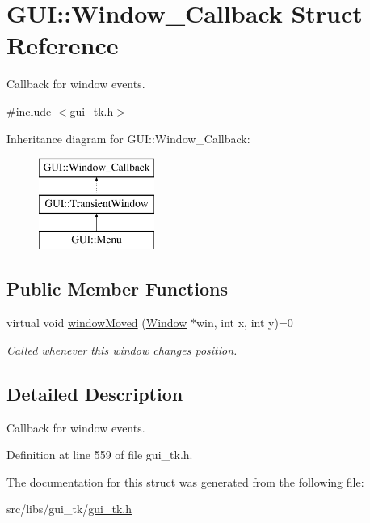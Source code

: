 \hypertarget{structGUI_1_1Window__Callback}{\section{G\-U\-I\-:\-:Window\-\_\-\-Callback Struct Reference}
\label{structGUI_1_1Window__Callback}
}


Callback for window events.  




{\ttfamily \#include $<$gui\-\_\-tk.\-h$>$}

Inheritance diagram for G\-U\-I\-:\-:Window\-\_\-\-Callback\-:\begin{figure}[H]
\begin{center}
\leavevmode
\includegraphics[height=3.000000cm]{structGUI_1_1Window__Callback}
\end{center}
\end{figure}
\subsection*{Public Member Functions}
\begin{DoxyCompactItemize}
\item 
\hypertarget{structGUI_1_1Window__Callback_a65e7bae539620c03486613128701b96f}{virtual void \hyperlink{structGUI_1_1Window__Callback_a65e7bae539620c03486613128701b96f}{window\-Moved} (\hyperlink{classGUI_1_1Window}{Window} $\ast$win, int x, int y)=0}\label{structGUI_1_1Window__Callback_a65e7bae539620c03486613128701b96f}

\begin{DoxyCompactList}\small\item\em Called whenever this window changes position. \end{DoxyCompactList}\end{DoxyCompactItemize}


\subsection{Detailed Description}
Callback for window events. 

Definition at line 559 of file gui\-\_\-tk.\-h.



The documentation for this struct was generated from the following file\-:\begin{DoxyCompactItemize}
\item 
src/libs/gui\-\_\-tk/\hyperlink{gui__tk_8h}{gui\-\_\-tk.\-h}\end{DoxyCompactItemize}
